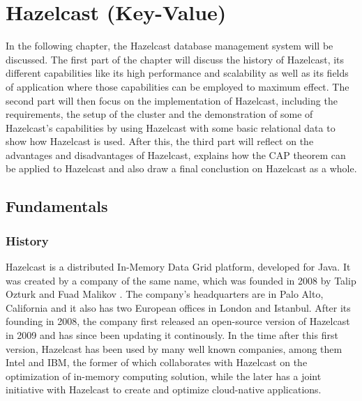 
\chapter{Hazelcast (Key-Value)} \label{ch:hazelcast}


In the following chapter, the Hazelcast database management system will be discussed. The first part of the chapter will discuss the history of Hazelcast, 
its different capabilities like its high performance and scalability as well as its fields of application where those capabilities can be 
employed to maximum effect. 
The second part will then focus on the implementation of Hazelcast, including the requirements, the setup of the cluster and the demonstration of 
some of Hazelcast's capabilities by using Hazelcast with some basic relational data to show how Hazelcast is used. After this, the third part will reflect on the advantages and disadvantages of Hazelcast, explains how the CAP theorem can be 
applied to Hazelcast and also draw a final conclustion on Hazelcast as a whole.

\section{Fundamentals} \label{sec:fundamentalsHazelcast}
\subsection{History} \label{subsec:historyHazelcast}
Hazelcast is a distributed In-Memory Data Grid platform, developed for Java. It was created by a company of the same name, 
which was founded in 2008 by Talip Ozturk and Fuad Malikov \parencite{DatabaseofDatabases.11032023}. The company's headquarters are 
in Palo Alto, California and it also has two European offices in London and Istanbul\parencite{HazelcastContact.03112022}. \newline
After its founding in 2008, the company first released an open-source version of Hazelcast in 2009 and has since been updating it 
continously\parencite{DatabaseofDatabases.11032023}. In the time after this first version, Hazelcast has been used by many well known companies, 
among them Intel and IBM, the former of which collaborates with Hazelcast on the optimization of in-memory computing solution, while 
the later has a joint initiative with Hazelcast to create and optimize cloud-native applications\parencite{HazelcastPartners.270122}.

